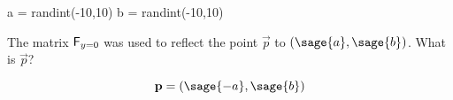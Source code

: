 \documentclass{ximera}
\author{Jenny Sheldon \and Bart Snapp}
\begin{document}
\makerandom
 
\begin{sagesilent}
  a = randint(-10,10)
  b = randint(-10,10)
\end{sagesilent}

\begin{exercise}
  The matrix $\mathsf{F}_{y=0}$ was used to reflect the point $\vec{p}$
  to $(\sage{a},\sage{b})$.  What is $\vec{p}$?
  \begin{prompt}
    \[
    \vec{p} = (\sage{-a},\sage{b})
    \]
  \end{prompt}
\end{exercise}
\end{document}

